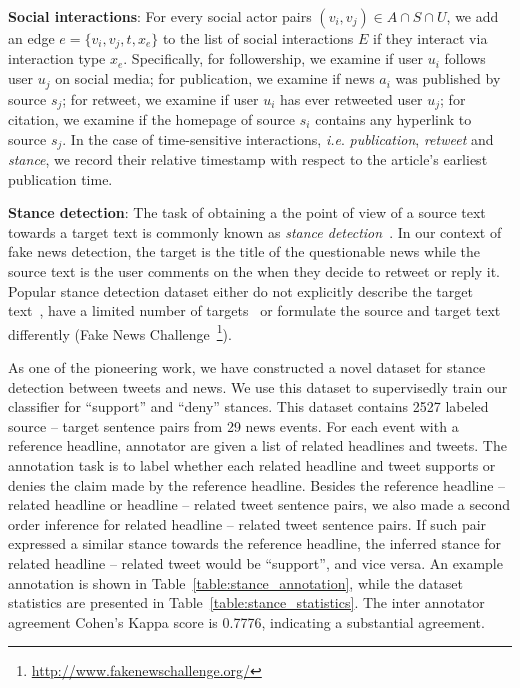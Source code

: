 \documentclass[fyp]{socreport}
\theoremstyle{definition}
\theoremstyle{hypothesis}
\begin{document}
\textbf{Social interactions}: For every social actor pairs $(v_i, v_j)\in A\cap S\cap U$, we add an edge $e=\{v_i, v_j, t, x_e\}$ to the list of social interactions $E$ if they interact via interaction type $x_e$. Specifically, for followership, we examine if user $u_i$ follows user $u_j$ on social media; for publication, we examine if news $a_i$ was published by source $s_j$; for retweet, we examine if user $u_i$ has ever retweeted user $u_j$; for citation, we examine if the homepage of source $s_i$ contains any hyperlink to source $s_j$. In the case of time-sensitive interactions, \textit{i.e}. \textit{publication}, \textit{retweet} and \textit{stance}, we record their relative timestamp with respect to the article's earliest publication time. 

\textbf{Stance detection}: The task of obtaining a the point of view of a source text towards a target text is commonly known as \textit{stance detection}~\cite{Kk2020StanceDA}. In our context of fake news detection, the target is the title of the questionable news while the source text is the user comments on the when they decide to retweet or reply it. Popular stance detection dataset either do not explicitly describe the target text~\cite{derczynski-etal-2017-semeval}, have a limited number of targets~\cite{sobhani-etal-2017-dataset,mohammad-etal-2016-semeval} or formulate the source and target text differently (Fake News Challenge~\footnote{\scriptsize{\url{http://www.fakenewschallenge.org/}}}). 

As one of the pioneering work, we have constructed a novel dataset for stance detection between tweets and news. We use this dataset to supervisedly train our classifier for ``support'' and ``deny'' stances. This dataset contains 2527 labeled source -- target sentence pairs from 29 news events. For each event with a reference headline, annotator are given a list of related headlines and tweets. The annotation task is to label whether each related headline and tweet supports or denies the claim made by the reference headline. Besides the reference headline -- related headline or headline -- related tweet sentence pairs, we also made a second order inference for related headline -- related tweet sentence pairs. If such pair expressed a similar stance towards the reference headline, the inferred stance for related headline -- related tweet would be ``support'', and vice versa. An example annotation is shown in Table~\ref{table:stance_annotation}, while the dataset statistics are presented in Table~\ref{table:stance_statistics}. The inter annotator agreement Cohen's Kappa score is 0.7776, indicating a substantial agreement.
\end{document}
